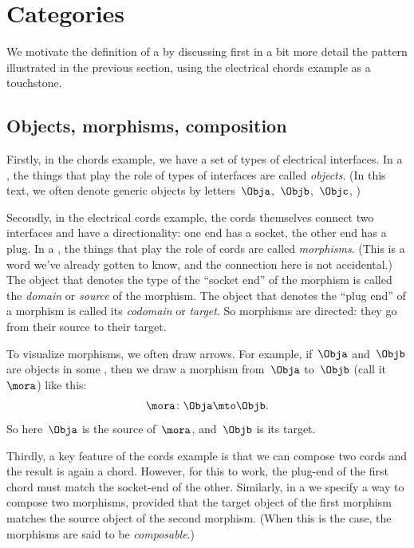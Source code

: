 
\section[Categories]{Categories}
\label{sec:formal-def-cats}



We motivate the definition of a  by discussing first in a bit more detail the pattern illustrated in the previous section, using the electrical chords example as a touchstone. 

\subsection{Objects, morphisms, composition}

Firstly, in the chords example, we have a set of types of electrical interfaces.
In a , the things that play the role of types of interfaces are called \emph{objects}.
(In this text, we often denote generic objects by letters~$\Obja$,~$\Objb$,~$\Objc$, \etc)

Secondly, in the electrical cords example, the cords themselves connect two interfaces and have a directionality: one end has a socket, the other end has a plug.
In a , the things that play the role of cords are called \emph{morphisms}.
(This is a word we've already gotten to know, and the connection here is not accidental.) The object that denotes the type of the ``socket end'' of the morphism is called the \emph{domain} or \emph{source} of the morphism.
The object that denotes the ``plug end'' of a morphism is called its \emph{codomain} or \emph{target}.
So morphisms are directed: they go from their source to their target.

To visualize morphisms, we often draw arrows.
For example, if~$\Obja$ and~$\Objb$ are objects in some , then we draw a morphism from~$\Obja$ to~$\Objb$ (call it~$\mora$) like this:
\begin{equation}
    \mora\colon \Obja \mto \Objb.
\end{equation}
So here~$\Obja$ is the source of~$\mora$, and~$\Objb$ is its target.

Thirdly, a key feature of the cords example is that we can compose two cords and the result is again a chord.
However, for this to work, the plug-end of the first chord must match the socket-end of the other.
Similarly, in a  we specify a way to compose two morphisms, provided that the target object of the first morphism matches the source object of the second morphism.
(When this is the case, the morphisms are said to be \emph{composable}.)

